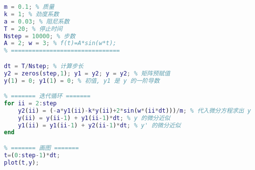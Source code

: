 \begin{lstlisting}[language=Matlab]
% ====== 设置参数 ===============
m = 0.1; % 质量
k = 1; % 劲度系数
a = 0.03; % 阻尼系数
T = 20; % 停止时间
Nstep = 10000; % 步数
A = 2; w = 3; % f(t)=A*sin(w*t);
% ===============================

dt = T/Nstep; % 计算步长
y2 = zeros(step,1); y1 = y2; y = y2; % 矩阵预赋值
y(1) = 0; y1(1) = 0; % 初值, y1 是 y 的一阶导数

% ======= 迭代循环 =======
for ii = 2:step
    y2(ii) = (-a*y1(ii)-k*y(ii)+2*sin(w*(ii*dt)))/m; % 代入微分方程求出 y''.
    y(ii) = y(ii-1) + y1(ii-1)*dt; % y 的微分近似
    y1(ii) = y1(ii-1) + y2(ii-1)*dt; % y' 的微分近似
end

% ======= 画图 =======
t=(0:step-1)*dt;
plot(t,y);
\end{lstlisting}
